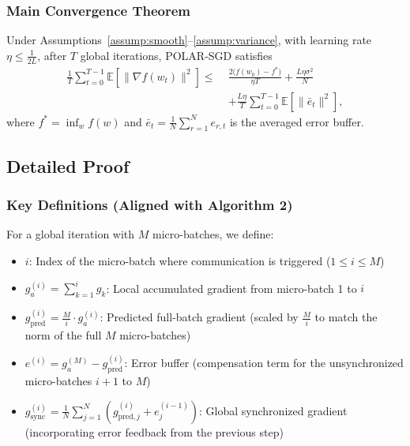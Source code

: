 \noindent

\subsubsection{Main Convergence Theorem}

\begin{theorem}
\label{thm:convergence}
Under Assumptions~\ref{assump:smooth}--\ref{assump:variance}, with learning rate $\eta \leq \frac{1}{2L}$, after $T$ global iterations, POLAR-SGD satisfies
\begin{equation}
\begin{aligned}
\frac{1}{T}\sum_{t=0}^{T-1}\mathbb{E}\left[\|\nabla f(w_t)\|^2\right]
\le\;&
\frac{2\big(f(w_0)-f^*\big)}{\eta T}
+ \frac{L\eta\sigma^2}{N}
\\
&+ \frac{L\eta}{T}\sum_{t=0}^{T-1}\mathbb{E}\left[\|\bar e_t\|^2\right],
\end{aligned}
\label{eq:main_bound}
\end{equation}
where $f^*=\inf_w f(w)$ and $\bar e_t=\frac{1}{N}\sum_{r=1}^N e_{r,t}$ is the averaged error buffer.
\end{theorem}

\subsection{Detailed Proof}
\label{app:proof}

\subsubsection{Key Definitions (Aligned with Algorithm 2)}
For a global iteration with $M$ micro-batches, we define:
\begin{itemize}
  \item $i$: Index of the micro-batch where communication is triggered ($1 \leq i \leq M$)
  \item $g_a^{(i)} = \sum_{k=1}^i g_{k}$: Local accumulated gradient from micro-batch 1 to $i$
  \item $g_{\text{pred}}^{(i)} = \frac{M}{i} \cdot g_a^{(i)}$: Predicted full-batch gradient (scaled by $\frac{M}{i}$ to match the norm of the full $M$ micro-batches)
  \item $e^{(i)} = g_a^{(M)} - g_{\text{pred}}^{(i)}$: Error buffer (compensation term for the unsynchronized micro-batches $i+1$ to $M$)
  \item $g_{\text{sync}}^{(i)} = \frac{1}{N}\sum_{j=1}^N \left(g_{\text{pred},j}^{(i)} + e_j^{(i-1)}\right)$: Global synchronized gradient (incorporating error feedback from the previous step)
\end{itemize}

